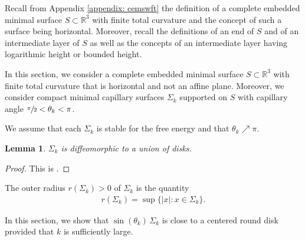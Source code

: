 \documentclass[11pt]{amsart}
\newtheorem{lem}[prop]{Lemma}
\begin{document}
Recall from Appendix \ref{appendix: cemswft} the definition of a complete embedded minimal surface $S\subset \mathbb{R}^3$ with finite total curvature and the concept of such a surface being horizontal. Moreover, recall the definitions of an end of $S$ and of an intermediate layer of $S$ as well as the concepts of an  intermediate layer  having logarithmic height or bounded height.



	In this section,  we consider  a complete embedded minimal surface $S\subset \mathbb{R}^3$ with finite total curvature that is horizontal and  not an affine plane. Moreover, we consider compact minimal capillary surfaces $\Sigma_k$ supported on $S$ with capillary angle $\sfrac{\pi}2<\theta_k<\pi$.
	
	We assume that each $\Sigma_k$ is stable for the free energy and that $\theta_k\nearrow  \pi$.
	

\begin{lem} \label{disk}
	 $\Sigma_k$ is diffeomorphic to a union of disks.
\end{lem}
\begin{proof}
	This is \cite[Lemma 49]{eichmair2024penrose}.
\end{proof}
The outer radius $r(\Sigma_k)>0$ of $\Sigma_k$ is the quantity 
\begin{align} \label{area radius} 
r(\Sigma_k)=\sup\{|x|:x\in \Sigma_k\}.
\end{align}

	In this section, we show that  $\sin(\theta_k)\,\Sigma_k$ is close to a centered round disk provided that $k$ is sufficiently large. 
	
\end{document}
